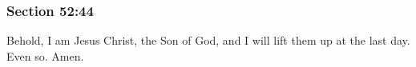 	\subsubsection{Section 52:44} %
		\label{DC52-44}

		Behold, I am Jesus Christ, the Son of God, and I will lift them up at the last day.  Even so.  Amen.

